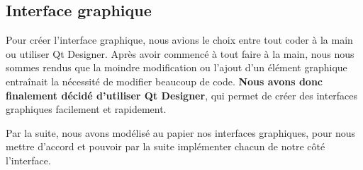 \subsection{Interface graphique}

Pour créer l'interface graphique, nous avions le choix entre tout coder \og à la main\fg{} ou utiliser Qt Designer. Après avoir commencé à tout faire à la main, nous nous sommes rendus que la moindre modification ou l'ajout d'un élément graphique entraînait la nécessité de modifier beaucoup de code. \textbf{Nous avons donc finalement décidé d'utiliser Qt Designer}, qui permet de créer des interfaces graphiques facilement et rapidement.

\medskip

Par la suite, nous avons modélisé au papier nos interfaces graphiques, pour nous mettre d'accord et pouvoir par la suite implémenter chacun de notre côté l'interface.